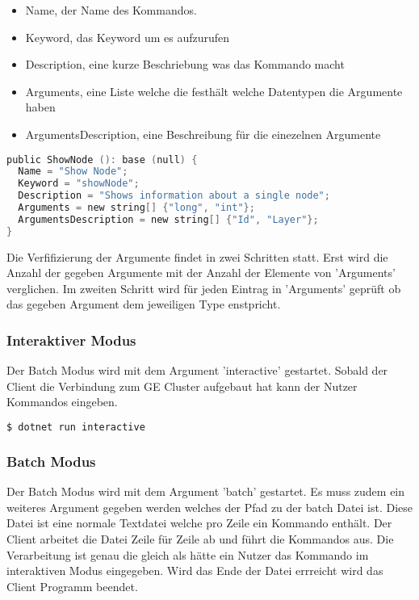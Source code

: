 \begin{itemize}
  \item Name, der Name des Kommandos.
  \item Keyword, das Keyword um es aufzurufen
  \item Description, eine kurze Beschriebung was das Kommando macht
  \item Arguments, eine Liste welche die festhält welche Datentypen die Argumente haben
  \item ArgumentsDescription, eine Beschreibung für die einezelnen Argumente
\end{itemize}

\begin{lstlisting}[language=c]
public ShowNode (): base (null) {
  Name = "Show Node";
  Keyword = "showNode";
  Description = "Shows information about a single node";
  Arguments = new string[] {"long", "int"};
  ArgumentsDescription = new string[] {"Id", "Layer"};
}
\end{lstlisting}


Die Verfifizierung der Argumente findet in zwei Schritten statt. Erst wird die Anzahl der gegeben Argumente mit der Anzahl der Elemente von 'Arguments' verglichen.
Im zweiten Schritt wird für jeden Eintrag in 'Arguments' geprüft ob das gegeben Argument dem jeweiligen Type enstpricht.





\subsubsection{Interaktiver Modus}

Der Batch Modus wird mit dem Argument 'interactive' gestartet. Sobald der Client die Verbindung zum GE Cluster aufgebaut hat kann der Nutzer Kommandos eingeben.


\begin{lstlisting}[language=bash]
  $ dotnet run interactive
\end{lstlisting}


\subsubsection{Batch Modus}
 Der Batch Modus wird mit dem Argument 'batch' gestartet. Es muss zudem ein weiteres Argument gegeben werden welches der Pfad zu der batch Datei ist.
 Diese Datei ist eine normale Textdatei welche pro Zeile ein Kommando enthält. Der Client arbeitet die Datei Zeile für Zeile ab und führt die Kommandos aus.
 Die Verarbeitung ist genau die gleich als hätte ein Nutzer das Kommando im interaktiven Modus eingegeben. Wird das Ende der Datei errreicht wird das Client Programm beendet.

